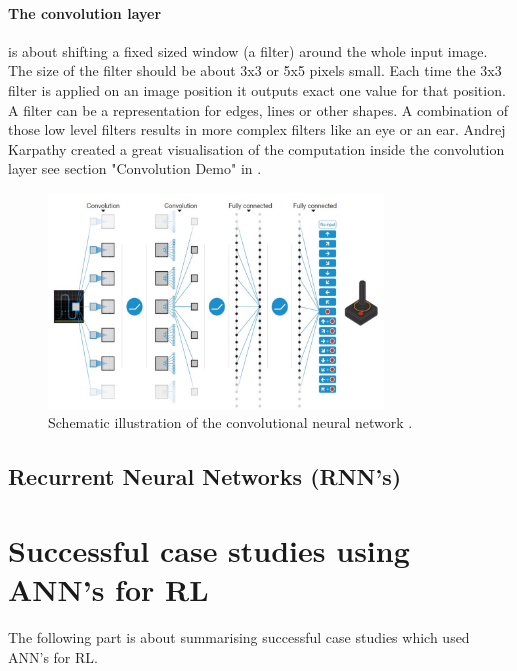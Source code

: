 \documentclass[conference]{IEEEtran}
\begin{document}
\paragraph{The convolution layer} is about shifting a fixed sized window (a filter) around the whole input image. The size of the filter should be about 3x3 or 5x5 pixels small. Each time the 3x3 filter is applied on an image position it outputs exact one value for that position. A filter can be a representation for edges, lines or other shapes. A combination of those low level filters results in more complex filters like an eye or an ear. Andrej Karpathy created a great visualisation of the computation inside the convolution layer see section "Convolution Demo" in \cite{KarpathyCNN}.

\begin{figure}[!t]
\centering
\includegraphics[width=3.5in]{conv_net}
\caption{Schematic illustration of the convolutional neural network \cite{DRL:HumanLevelControl}.}
\label{fig:conv_net}
\end{figure}

\subsection{Recurrent Neural Networks (RNN's)}


\section{Successful case studies using ANN's for RL}
The following part is about summarising successful case studies which used ANN's for RL. 
\end{document}

